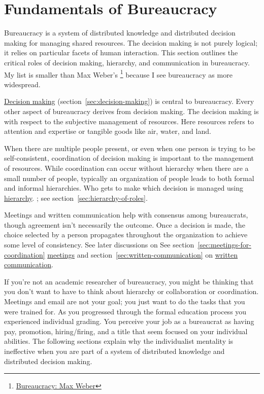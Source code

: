 \section{Fundamentals of Bureaucracy\label{sec:fundamentals-of-b}}
  
Bureaucracy is a system of distributed knowledge and distributed decision making for managing shared resources. The decision making is not purely logical; it relies on particular facets of human interaction. This section outlines the critical roles of decision making, hierarchy, and communication in bureaucracy. 
My list is smaller than Max Weber's \cite{2015_Weber}\footnote{\href{https://en.wikipedia.org/wiki/Bureaucracy\#Max_Weber}{Bureaucracy: Max Weber}} because I see bureaucracy as more widespread.

\hyperref[sec:decision-making]{Decision making}
\ifsectionref
(section~\ref{sec:decision-making}) 
\fi
is central to bureaucracy. Every other aspect of bureaucracy derives from decision making. The decision making is with respect to the subjective management of resources. Here resources refers to attention and expertise or tangible goods like air, water, and land. 

When there are multiple people present, or even when one person is trying to be self-consistent, coordination of decision making is important to the management of resources. While coordination can occur without hierarchy when there are a small number of people, typically an organization of people leads to both formal and informal hierarchies. Who gets to make which decision is managed using
\hyperref[sec:hierarchy-of-roles]{hierarchy}.
\ifsectionref
; see section~\ref{sec:hierarchy-of-roles}.
\fi

Meetings and written communication help with consensus among bureaucrats, though agreement isn't necessarily the outcome.
Once a decision is made, the choice selected by a person propagates throughout the organization to achieve some level of consistency. 
See later discussions on
\ifsectionref
See section~\ref{sec:meetings-for-coordination}
\fi
\hyperref[sec:meetings-for-coordination]{meetings} and 
\ifsectionref
section~\ref{sec:written-communication} on
\fi
\hyperref[sec:written-communication]{written communication}.

If you're not an academic researcher of bureaucracy, you might be thinking that you don't want to have to think about hierarchy or collaboration or coordination. Meetings and email are not your goal; you just want to do the tasks that you were trained for. As you progressed through the formal education process you experienced individual grading. You perceive your job as a bureaucrat as having pay, promotion, hiring/firing, and a title that  seem focused on your individual abilities. The following sections explain why the individualist mentality is ineffective when you are part of a system of distributed knowledge and distributed decision making. 


